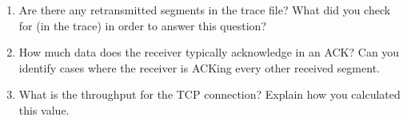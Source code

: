 \begin{enumerate}[label=\bfseries Problem \arabic*:,leftmargin=*,labelindent=1em]
        \soln
        \item Are there any retransmitted segments in the trace file? What did you check for (in the trace) in order to answer this question?\\[0.2mm]
        \soln
        \item How much data does the receiver typically acknowledge in an ACK? Can you identify cases where the receiver is ACKing every other received segment.\\[0.2mm]
        \soln
        \item What is the throughput for the TCP connection? Explain how you calculated this value.\\[0.2mm]
        \soln
    \end{enumerate}
\newpage